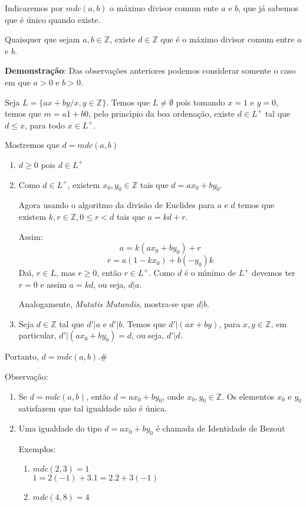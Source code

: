 \begin{nota} Indicaremos por $mdc(a,b)$ o m{\'a}ximo divisor comum ente $a$ e $b$, que j{\'a} sabemos que {\'e} {\'u}nico quando existe.\end{nota}

\begin{proposicao} Quaisquer que sejam $a,b\in\mathbb{Z}$, existe $d\in\mathbb{Z}$ que {\'e} o m{\'a}ximo divisor comum entre $a$ e $b$.\end{proposicao}

\textbf{Demonstra{\c c}{\~a}o}: Das observa{\c c}{\~o}es anteriores podemos considerar somente o caso em que $a>0$ e $b>0$.

Seja $L=\{ax+by/x,y\in\mathbb{Z}\}$. Temos que $L\neq\emptyset$ pois tomando $x=1$ e $y=0$, temos que $m=a1+b0$, pelo princ{\'\i}pio da boa ordena{\c c}{\~a}o, existe $d\in L^{+}$ tal que $d\leq x$, para todo $x\in L^{+}$.

Mostremos que $d=mdc(a,b)$
\begin{enumerate}
\item $d\geq 0$ pois $d\in L^{+}$
\item Como $d\in L^{+}$, existem $x_{0},y_{0}\in\mathbb{Z}$ tais que $d=ax_{0}+by_{0}$.

Agora usando o algoritmo da divis{\~a}o de Euclides para $a$ e $d$ temos que existem $k,r\in\mathbb{Z},0\leq r<d$ tais que $a=kd+r$.

Assim:\[a=k(ax_{0}+by_{0})+r\] \[r=a(1-kx_{0})+b(-y_{0})k\] Da{\'\i}, $r\in L$, mas $r\geq 0$, ent{\~a}o $r\in L^{+}$. Como $d$ {\'e} o m{\'\i}nimo de $L^{+}$ devemos ter $r=0$ e assim $a=kd$, ou seja, $d|a$.

Analogamente, \textit{Mutatis Mutandis}, mostra-se que $d|b$.
\item Seja $d\in\mathbb{Z}$ tal que $d'|a$ e $d'|b$. Temos que $d'|(ax+by)$, para $x,y\in\mathbb{Z}$, em particular, $d'|(ax_{0}+by_{0})=d$, ou seja, $d'|d$.
\end{enumerate}

Portanto, $d=mdc(a,b)$.\#

Observa{\c c}{\~a}o:
\begin{enumerate}
\item Se $d=mdc(a,b)$, ent{\~a}o $d=ax_{0}+by_{0}$, onde $x_{0},y_{0}\in\mathbb{Z}$. Os elementos $x_{0}$ e $y_{0}$ satisfazem que tal igualdade n{\~a}o {\'e} {\'u}nica.
\item Uma igualdade do tipo $d=ax_{0}+by_{0}$ {\'e} chamada de Identidade de Bezout

Exemplos:
\begin{enumerate}
\item $mdc(2,3)=1$\\
$1=2(-1)+3.1=2.2+3(-1)$
\item $mdc(4,8)=4$\\
\end{enumerate}
\end{enumerate}


